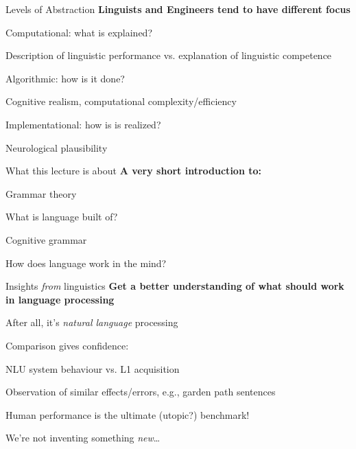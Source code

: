 \documentclass[aspectratio=169,cramped]{beamer}
\let\tempone\itemize
\let\temptwo\enditemize
\renewenvironment{itemize}{\tempone\addtolength{\itemsep}{-0\baselineskip}\addtolength{\parskip}{-0.2\baselineskip}}{\temptwo}
\newcommand{\ex}[1]{{\color{teal} #1}}
\begin{document}
\begin{frame}{Levels of Abstraction}
	\textbf{Linguists and Engineers tend to have different focus}
	\begin{itemize}
  \item Computational: what is explained?
    \begin{itemize}
    \item \ex{Description of linguistic performance vs. explanation of linguistic competence}
    \end{itemize}
  \item Algorithmic: how is it done?
    \begin{itemize}
    \item  \ex{Cognitive realism, computational complexity/efficiency}
    \end{itemize}
  \item Implementational: how is is realized?
    \begin{itemize}
    \item  \ex{Neurological plausibility}
    \end{itemize}
  \end{itemize}
\end{frame}

\begin{frame}{What this lecture is about}
	\textbf{A very short introduction to:}
	\begin{itemize}
  \item Grammar theory
    \begin{itemize}
    \item What is language built of?
    \end{itemize}
  \item Cognitive grammar
    \begin{itemize}
    \item How does language work in the mind?
    \end{itemize}
  \end{itemize}
\end{frame}

\begin{frame}{Insights \textit{from} linguistics}
	\textbf{Get a better understanding of what should work in language processing}
	\begin{itemize}
  \item After all, it's \emph{natural language} processing
  \item Comparison gives confidence:
    \begin{itemize}
    \item NLU system behaviour vs. L1 acquisition
    \item Observation of similar effects/errors, e.g., garden path sentences
    \item Human performance is the ultimate (utopic?) benchmark!
    \item We're not inventing something \emph{new}\ldots
    \end{itemize}
  \end{itemize}
\end{frame}
\end{document}
